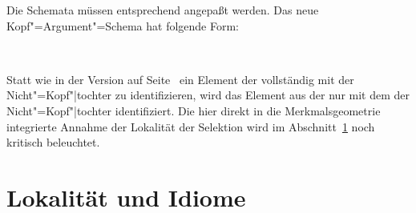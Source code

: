 \noindent
Die Schemata müssen entsprechend angepaßt werden. Das neue Kopf"=Argument"=Schema
hat folgende Form:
\begin{schema}
\label{schema-head-arg}
 \impl\\
\end{schema}
Statt wie in der Version auf Seite~\pageref{schema-bin-prel2} ein Element
der \subcatl vollständig mit der Nicht"=Kopf"|tochter zu identifizieren, wird
das Element aus der \subcatl nur mit dem \synsemw der Nicht"=Kopf"|tochter identifiziert.
Die hier direkt in die Merkmalsgeometrie integrierte Annahme der Lokalität der Selektion
wird im Abschnitt~\ref{disc-lokalitaet} noch kritisch beleuchtet.


\section{Lokalität und Idiome}
\label{disc-lokalitaet}

